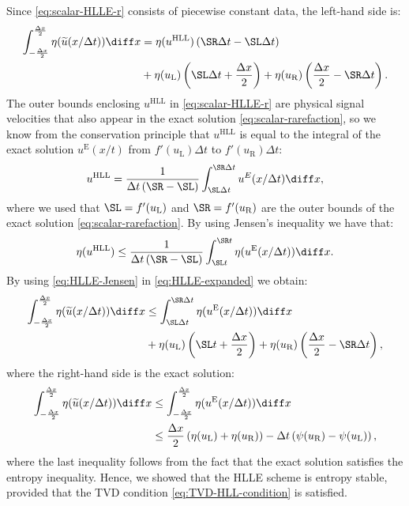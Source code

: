 Since \eqref{eq:scalar-HLLE-r} consists of piecewise constant data, the left-hand side is:
\begin{align} \label{eq:HLLE-expanded}
\int_{-\frac{\Delta x}{2}}^{\frac{\Delta x}{2}} \eta (\widetilde{u}(x/ \Delta t)) \diff x
& = 
\eta(u^\text{HLL}) \left( \SR \Delta t - \SL \Delta t \right) \notag \\
& + \eta(u_\text{L}) \left( \SL \Delta t + \frac{\Delta x}{2} \right)
  + \eta(u_\text{R}) \left( \frac{\Delta x}{2} - \SR \Delta t \right). 
\end{align}
The outer bounds enclosing $ u^\text{HLL} $ in \eqref{eq:scalar-HLLE-r} are physical signal velocities that also appear in the exact solution \eqref{eq:scalar-rarefaction}, so we know from the conservation principle that $ u^\text{HLL} $ is equal to the integral of the exact solution $ u^\text{E}(x/t) $ from $ f'(u_\text{L}) \Delta t $ to $ f'(u_\text{R}) \Delta t $:
\begin{equation}
u^\text{HLL} = \frac{1}{\Delta t \left( \SR - \SL \right)} \int_{\SL \Delta t}^{\SR \Delta t} u^E(x/\Delta t) \diff x,
\end{equation}
where we used that $ \SL = f'(u_\text{L}) $ and $ \SR = f'(u_\text{R}) $ are the outer bounds of the exact solution \eqref{eq:scalar-rarefaction}. By using Jensen's inequality we have that:
\begin{equation} \label{eq:HLLE-Jensen}
\eta(u^\text{HLL}) \leq \frac{1}{\Delta t \left( \SR - \SL \right)} \int_{\SL t}^{\SR t} \eta(u^\text{E}(x/\Delta t)) \diff x .
\end{equation}
By using \eqref{eq:HLLE-Jensen} in \eqref{eq:HLLE-expanded} we obtain:
\begin{align}
\int_{-\frac{\Delta x}{2}}^{\frac{\Delta x}{2}} \eta (\widetilde{u}(x/\Delta t)) \diff x
& \leq 
\int_{\SL \Delta t}^{\SR \Delta t} \eta(u^\text{E}(x/ \Delta t)) \diff x \notag \\
& + \eta(u_\text{L}) \left( \SL t + \frac{\Delta x}{2} \right)
  + \eta(u_\text{R}) \left( \frac{\Delta x}{2} - \SR \Delta t \right),
\end{align}
where the right-hand side is the exact solution:
\begin{align}
\int_{-\frac{\Delta x}{2}}^{\frac{\Delta x}{2}} \eta (\widetilde{u}(x/\Delta t)) \diff x
& \leq
\int_{-\frac{\Delta x}{2}}^{\frac{\Delta x}{2}} \eta (u^\text{E}(x/\Delta t)) \diff x \notag \\
& \leq \frac{\Delta x}{2} \left( \eta (u_\text{L})
     + \eta (u_\text{R}) \right) - \Delta t \left( \psi(u_\text{R}) - \psi (u_\text{L}) \right),
\end{align}
where the last inequality follows from the fact that the exact solution satisfies the entropy inequality. Hence, we showed that the HLLE scheme is entropy stable, provided that the TVD condition \eqref{eq:TVD-HLL-condition} is satisfied.


